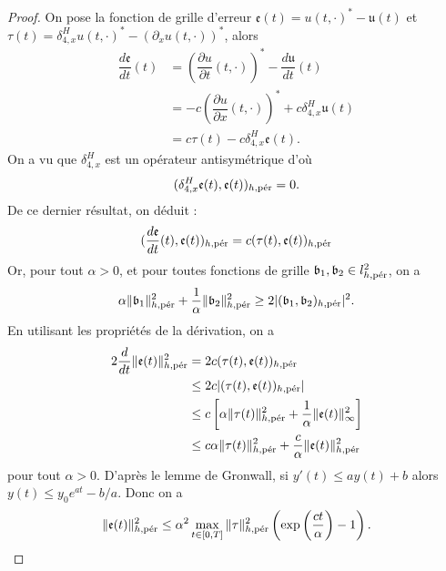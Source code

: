 \begin{proof}
On pose la fonction de grille d'erreur $\mathfrak{e}(t) = u(t,\cdot)^* - \mathfrak{u}(t)$ et $\mathfrak{\tau}(t) = \delta_{4,x}^H u(t,\cdot)^* - (\partial_x u(t,\cdot))^*$, alors
\begin{align*}
\dfrac{d \mathfrak{e}}{dt}(t) & = \left(\dfrac{\partial u}{\partial t}(t,\cdot)\right)^* - \dfrac{d \mathfrak{u}}{dt}(t) \\
	& = - c \left( \dfrac{\partial u}{\partial x}(t,\cdot) \right)^* + c \delta_{4,x}^H \mathfrak{u}(t) \\
	& = c \mathfrak{\tau}(t) - c \delta_{4,x}^H \mathfrak{e}(t).
\end{align*}
On a vu que $\delta_{4,x}^H$ est un opérateur antisymétrique d'où
\begin{equation}
( \delta_{4,x}^H \mathfrak{e}(t), \mathfrak{e}(t) )_{h,\per} = 0.
\end{equation}
De ce dernier résultat, on déduit :
\begin{equation}
( \dfrac{d \mathfrak{e}}{dt}(t) , \mathfrak{e}(t) )_{h,\per} = c ( \mathfrak{\tau}(t), \mathfrak{e}(t))_{h,\per}
\end{equation}
Or, pour tout $\alpha >0$, et pour toutes fonctions de grille $\mathfrak{b}_1,\mathfrak{b}_2   \in l^2_{h,\per}$, on a
\begin{equation}
\alpha \| \mathfrak{b}_1 \|^2_{h,\per} + \dfrac{1}{\alpha} \| \mathfrak{b}_2 \|_{h,\per}^2 \geq 2 |(\mathfrak{b}_1, \mathfrak{b}_2)_{h,\per}|^2.
\end{equation}
En utilisant les propriétés de la dérivation, on a
\begin{align*}
2\dfrac{d}{dt} \|\mathfrak{e}(t)\|_{h,\per}^2 & = 2 c ( \mathfrak{\tau}(t), \mathfrak{e}(t))_{h,\per} \\
   & \leq 2 c |( \mathfrak{\tau}(t), \mathfrak{e}(t))_{h,\per}| \\
   & \leq c \left[ \alpha \|\mathfrak{\tau}(t)\|_{h,\per}^2 + \dfrac{1}{\alpha} \|\mathfrak{e}(t)\|_{\infty}^2 \right] \\
   & \leq c \alpha \|\mathfrak{\tau}(t)\|^2_{h,\per} + \dfrac{c}{\alpha} \|\mathfrak{e}(t)\|^2_{h,\per} 
\end{align*}
pour tout $\alpha > 0$.
D'après le lemme de Gronwall, si $y'(t) \leq a y(t) + b$ alors $y(t) \leq y_0 e^{at} - b/a$. Donc on a
\begin{equation}
\|\mathfrak{e}(t)\|_{h,\per}^2 \leq \alpha^2 \max_{t \in [0,T]} \|\mathfrak{\tau}\|_{h,\per}^2   \left( \exp \left( \dfrac{ct}{\alpha} \right) -1  \right).

\end{equation}
\end{proof}
